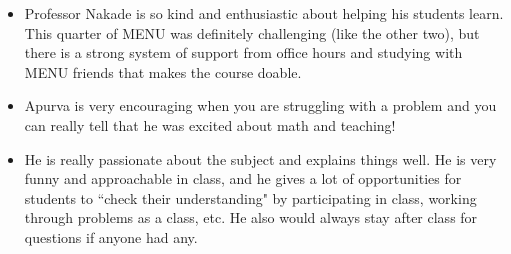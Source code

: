 \documentclass[10pt]{amsbook}
\begin{document}
\begin{itemize}
    \item Professor Nakade is so kind and enthusiastic about helping his students learn. This quarter of MENU was definitely challenging
    (like the other two), but there is a strong system of support from office hours and studying with MENU friends that makes the course
    doable. 
    \item Apurva is very encouraging when you are struggling with a problem and you can really tell that he was excited about math and
    teaching!        
    \item He is really passionate about the subject and explains things well. He is very funny and approachable in class, and he gives a lot of
    opportunities for students to ``check their understanding" by participating in class, working through problems as a class, etc. He
    also would always stay after class for questions if anyone had any.
    
  \end{itemize}
\end{document}
